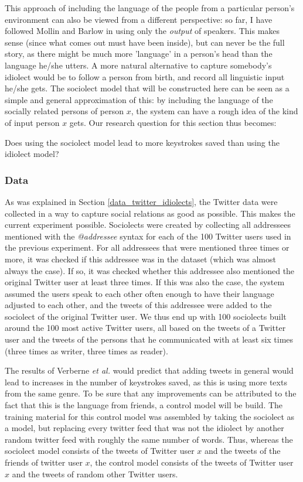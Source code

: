 \documentclass[11pt]{article}
\begin{document}
This approach of including the language of the people from a particular person's environment can also be viewed from a different perspective: so far, I have followed Mollin  and Barlow in using only the \emph{output} of speakers. This makes sense (since what comes out must have been inside), but can never be the full story, as there might be much more 'language' in a person's head than the language he/she utters. A more natural alternative to capture somebody's idiolect would be to follow a person from birth, and record all linguistic input he/she gets. The sociolect model that will be constructed here can be seen as a simple and general approximation of this: by including the language of the socially related persons of person $x$, the system can have a rough idea of the kind of input person $x$ gets. Our research question for this section thus becomes:

\begin{examples}
\item Does using the sociolect model lead to more keystrokes saved than using the idiolect model?
\end{examples}

\subsubsection{Data}
As was explained in Section \ref{data_twitter_idiolects}, the Twitter data were collected in a way to capture social relations as good as possible. This makes the current experiment possible. Sociolects were created by collecting all addressees mentioned with the \emph{@addressee} syntax for each of the 100 Twitter users used in the previous experiment. For all addressees that were mentioned three times or more, it was checked if this addressee was in the dataset (which was almost always the case). If so, it was checked whether this addressee also mentioned the original Twitter user at least three times. If this was also the case, the system assumed the users speak to each other often enough to have their language adjusted to each other, and the tweets of this addressee were added to the sociolect of the original Twitter user. We thus end up with 100 sociolects built around the 100 most active Twitter users, all based on the tweets of a Twitter user and the tweets of the persons that he communicated with at least six times (three times as writer, three times as reader).

The results of Verberne {\em et al.}  would predict that adding tweets in general would lead to increases in the number of keystrokes saved, as this is using more texts from the same genre. To be sure that any improvements can be attributed to the fact that this is the language from friends, a control model will be build. The training material for this control model was assembled by taking the sociolect as a model, but replacing every twitter feed that was not the idiolect by another random twitter feed with roughly the same number of words. Thus, whereas the sociolect model consists of the tweets of Twitter user $x$ and the tweets of the friends of twitter user $x$, the control model consists of the tweets of Twitter user $x$ and the tweets of random other Twitter users.
\end{document}
